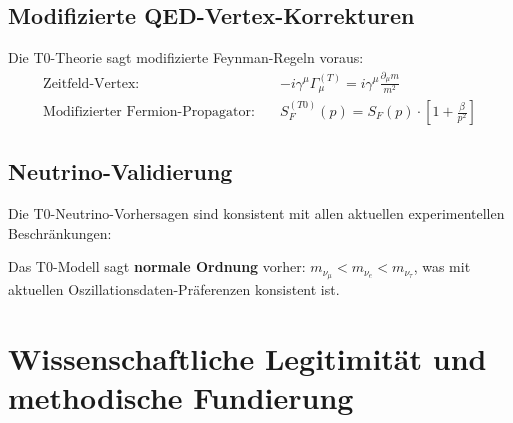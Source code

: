 	\subsection{Modifizierte QED-Vertex-Korrekturen}
	\label{subsec:qed_corrections}
	
	Die T0-Theorie sagt modifizierte Feynman-Regeln voraus:
	\begin{align}
		\text{Zeitfeld-Vertex:} \quad &-i\gamma^\mu\Gamma_\mu^{(T)} = i\gamma^\mu\frac{\partial_\mu m}{m^2} \\
		\text{Modifizierter Fermion-Propagator:} \quad &S_F^{(T0)}(p) = S_F(p) \cdot \left[1 + \frac{\beta}{p^2}\right]
	\end{align}
	
	\subsection{Neutrino-Validierung}
	\label{subsec:neutrino_validation}
	
	Die T0-Neutrino-Vorhersagen sind konsistent mit allen aktuellen experimentellen Beschränkungen:
	
	\begin{table}[H]
		\centering
		\caption{T0-Neutrino-Vorhersagen vs. experimentelle Beschränkungen}
		\label{tab:neutrino_validation}
	\end{table}
	
	\begin{important}
		Das T0-Modell sagt \textbf{normale Ordnung} vorher: $m_{\nu_\mu} < m_{\nu_e} < m_{\nu_\tau}$, was mit aktuellen Oszillationsdaten-Präferenzen konsistent ist.
	\end{important}
	
	\section{Wissenschaftliche Legitimität und methodische Fundierung}
	\label{sec:wissenschaftliche_legitimitaet}
	
